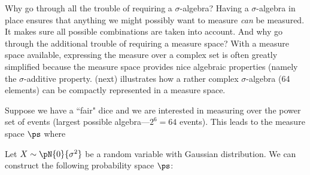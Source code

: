 Why go through all the trouble of requiring a $\sigma$-algebra?
Having a $\sigma$-algebra in place ensures that anything we might possibly
want to measure {\em can} be measured.
It makes sure all possible combinations are taken into account.
And why go through the additional trouble of requiring a measure space?
With a measure space available, expressing the measure over a complex
set is often greatly simplified because the measure space provides nice
algebraic properties (namely the $\sigma$-additive property.
 (next) illustrates how a rather complex
$\sigma$-algebra (64 elements) can be compactly represented in a measure space.
\begin{example}
\label{ex:prob_123456}
Suppose we have a ``fair" dice and we are interested in measuring over the
power set of events (largest possible algebra---$2^6=64$ events).
This leads to the measure space $\ps$ where
\end{example}

\begin{example}
Let $X\sim\pN{0}{\sigma^2}$ be a random variable with Gaussian distribution.
We can construct the following probability space $\ps$:

\end{example}

